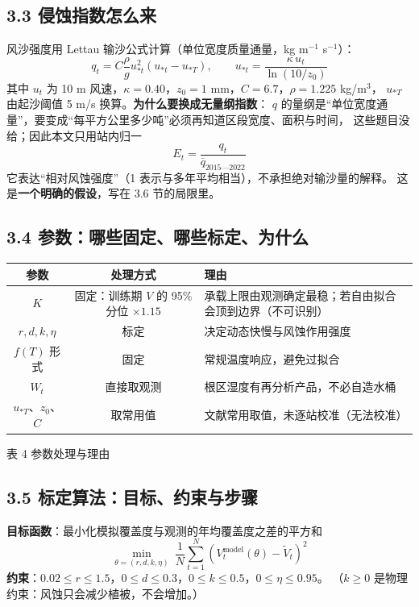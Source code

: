 \documentclass[11pt,a4paper]{ctexart}
\begin{document}
\subsection*{3.3 侵蚀指数怎么来}
风沙强度用 Lettau 输沙公式计算（单位宽度质量通量，kg m$^{-1}$ s$^{-1}$）：
\begin{equation}
q_t=C\frac{\rho}{g}u_{*t}^2\left(u_{*t}-u_{*T}\right),\qquad
u_{*t}=\frac{\kappa\,u_t}{\ln(10/z_0)}
\end{equation}
其中 $u_t$ 为 10 m 风速，$\kappa=0.40$，$z_0=1$ mm，$C=6.7$，$\rho=1.225$ kg/m$^3$，
$u_{*T}$ 由起沙阈值 5 m/s 换算。\textbf{为什么要换成无量纲指数}：
$q$ 的量纲是“单位宽度通量”，要变成“每平方公里多少吨”必须再知道区段宽度、面积与时间，
这些题目没给；因此本文只用站内归一
\begin{equation}
E_t=\frac{q_t}{\overline{q}_{2015\text{—}2022}}
\end{equation}
它表达“相对风蚀强度”（1 表示与多年平均相当），不承担绝对输沙量的解释。
这是\textbf{一个明确的假设}，写在 3.6 节的局限里。

\subsection*{3.4 参数：哪些固定、哪些标定、为什么}
\begin{table}[H]\centering\small\setlength{\parskip}{1pt}
\begin{tabularx}{\textwidth}{|c|c|X|}
\toprule
参数 & 处理方式 & 理由 \\
\midrule
$K$ & 固定：训练期 $V$ 的 95\% 分位 $\times1.15$ & 承载上限由观测确定最稳；若自由拟合会顶到边界（不可识别） \\
$r,d,k,\eta$ & 标定 & 决定动态快慢与风蚀作用强度 \\
$f(T)$ 形式 & 固定 & 常规温度响应，避免过拟合 \\
$W_t$ & 直接取观测 & 根区湿度有再分析产品，不必自造水桶 \\
$u_{*T}$、$z_0$、$C$ & 取常用值 & 文献常用取值，未逐站校准（无法校准） \\
\bottomrule
\end{tabularx}
\begin{center}\small 表 4  参数处理与理由\end{center}
\end{table}

\subsection*{3.5 标定算法：目标、约束与步骤}
\textbf{目标函数}：最小化模拟覆盖度与观测的年均覆盖度之差的平方和
\begin{equation}
\min_{\theta=(r,d,k,\eta)}\ \frac{1}{N}\sum_{t=1}^{N}\left(V_t^{\text{model}}(\theta)-\tilde V_t\right)^2
\end{equation}
\textbf{约束}：$0.02\le r\le1.5$，$0\le d\le0.3$，$0\le k\le0.5$，$0\le\eta\le0.95$。
（$k\ge0$ 是物理约束：风蚀只会减少植被，不会增加。）
\end{document}
